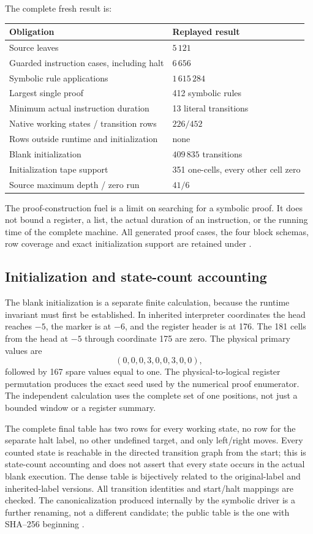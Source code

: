 The complete fresh result is:
\begin{center}
\begin{tabularx}{\linewidth}{@{}lX@{}}\toprule
Obligation & Replayed result\\\midrule
Source leaves & $5\,121$\\
Guarded instruction cases, including halt & $6\,656$\\
Symbolic rule applications & $1\,615\,284$\\
Largest single proof & 412 symbolic rules\\
Minimum actual instruction duration & 13 literal transitions\\
Native working states / transition rows & $226/452$\\
Rows outside runtime and initialization & none\\
Blank initialization & $409\,835$ transitions\\
Initialization tape support & 351 one-cells, every other cell zero\\
Source maximum depth / zero run & $41/6$\\
\bottomrule\end{tabularx}
\end{center}
The proof-construction fuel is a limit on searching for a symbolic proof.
It does not bound a register, a list, the actual duration of an instruction,
or the running time of the complete machine. All generated proof cases, the four block schemas, row coverage and exact initialization support
are retained under .

\subsection{Initialization and state-count accounting}

The blank initialization is a separate finite calculation, because the
runtime invariant must first be established. In inherited interpreter
coordinates the head reaches $-5$, the marker is at $-6$, and the register
header is at 176. The 181 cells from the head at $-5$ through coordinate 175 are zero. The physical
primary values are
\[
                    (0,0,0,3,0,0,3,0,0),
\]
followed by 167 spare values equal to one. The physical-to-logical register
permutation produces the exact seed used by the numerical proof enumerator.
The independent calculation uses the complete set of one positions, not
just a bounded window or a register summary.

The complete final table has two rows for every working state, no row for
the separate halt label, no other undefined target, and only left/right
moves. Every counted state is reachable in the directed transition graph
from the start; this is state-count accounting and does not assert that
every state occurs in the actual blank execution. The dense table is
bijectively related to the original-label and inherited-label versions.
All transition identities and start/halt mappings are checked. The
canonicalization produced internally by the symbolic driver is a further
renaming, not a different candidate; the public table is the one with
SHA--256 beginning .

